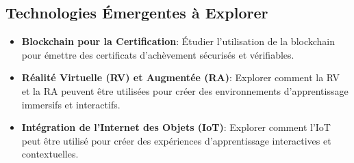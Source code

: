 \subsection{Technologies Émergentes à Explorer}
\begin{itemize}[leftmargin=*,label=\textbullet,font=\color{violet}]
    \item \textbf{Blockchain pour la Certification}: Étudier l'utilisation de la blockchain pour émettre des certificats d'achèvement sécurisés et vérifiables.
    \item \textbf{Réalité Virtuelle (RV) et Augmentée (RA)}: Explorer comment la RV et la RA peuvent être utilisées pour créer des environnements d'apprentissage immersifs et interactifs.
    \item \textbf{Intégration de l'Internet des Objets (IoT)}: Explorer comment l'IoT peut être utilisé pour créer des expériences d'apprentissage interactives et contextuelles.
\end{itemize}

